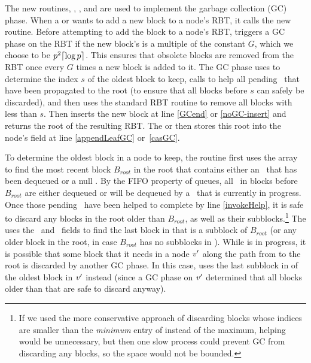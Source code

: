 The new routines, , ,  and  are
used to implement the garbage collection (GC) phase.
When a  or  wants to add a new block to a node's  RBT,
it calls the new  routine.
Before attempting to add the block to a node's RBT,  triggers a GC phase on the RBT if 
the new block's  is a multiple of the constant $G$, which we choose to be $p^2\lceil \log p \rceil$.
This ensures that obsolete blocks are removed from the RBT once every $G$ times a new block is added to it.
The GC phase uses  to determine the index $s$ of the oldest block to keep,
calls  to help all pending \dequeues\ that have been propagated to the root
(to ensure that all blocks before $s$ can safely be discarded), and then
uses the standard RBT  routine \cite{Tar83}
to remove all blocks with  less than $s$.
Then 
inserts the new block at line \ref{GCend} or \ref{noGC-insert}
and returns the root of the resulting RBT.
The  or  then stores this root into the node's  field at line 
 \ref{appendLeafGC} or~\ref{casGC}.

To determine the oldest block in a node  to keep, the  routine  first
uses the  array to
find the most recent block $B_{root}$ in the root that contains either an \enqueue\ that has been dequeued
or a null \dequeue.  By the FIFO property of queues, all \enqueues\ in blocks before $B_{root}$ are either
dequeued or will be dequeued by a \dequeue\ that is currently in progress.  Once those pending \dequeues\ have been
helped to complete by line \ref{invokeHelp},
it is safe to discard any blocks in the root older than $B_{root}$, as well
as their subblocks.\footnote{If we used the more conservative approach of discarding blocks whose indices 
are smaller than the \emph{minimum} entry of  instead of the maximum, helping would be unnecessary, but then one slow process could prevent GC from discarding any blocks, so the space would not be bounded.}
The  uses the \eleft\ and \eright\ fields to find the last block in  that is a subblock
of $B_{root}$ (or any older block in the root, in case $B_{root}$ has no subblocks in ).
While  is in progress, it is possible that some block that it needs in a node $\mbox{\textnormal{\textit{v}}}'$
along the path from  to the root is discarded by another GC phase.
In this case,  uses the last subblock in  of the oldest block in $\mbox{\textnormal{\textit{v}}}'$ instead
(since a GC phase on $\mbox{\textnormal{\textit{v}}}'$ determined that all blocks older than that are safe to discard anyway).

